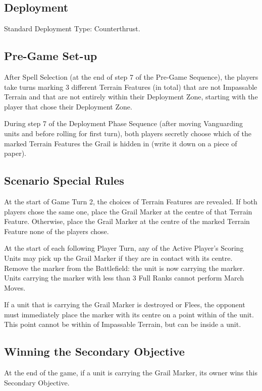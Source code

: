 
\label{TheHolyGrail}

\subsection*{Deployment}

Standard Deployment Type: Counterthrust.


\subsection*{Pre-Game Set-up}

After Spell Selection (at the end of step 7 of the Pre-Game Sequence), the players take turns marking 3 different Terrain Features (in total) that are not Impassable Terrain and that are not entirely within their Deployment Zone, starting with the player that chose their Deployment Zone.

During step 7 of the Deployment Phase Sequence (after moving Vanguarding units and before rolling for first turn), both players secretly choose which of the marked Terrain Features the Grail is hidden in (write it down on a piece of paper).

\subsection*{Scenario Special Rules}

At the start of Game Turn 2, the choices of Terrain Features are revealed. If both players chose the same one, place the Grail Marker at the centre of that Terrain Feature. Otherwise, place the Grail Marker at the centre of the marked Terrain Feature none of the players chose.

At the start of each following Player Turn, any of the Active Player's Scoring Units may pick up the Grail Marker if they are in contact with its centre. Remove the marker from the Battlefield: the unit is now carrying the marker. Units carrying the marker with less than 3 Full Ranks cannot perform March Moves.

If a unit that is carrying the Grail Marker is destroyed or Flees, the opponent must immediately place the marker with its centre on a point within  of the unit. This point cannot be within  of Impassable Terrain, but can be inside a unit.

\subsection*{Winning the Secondary Objective}

At the end of the game, if a unit is carrying the Grail Marker, its owner wins this Secondary Objective.
